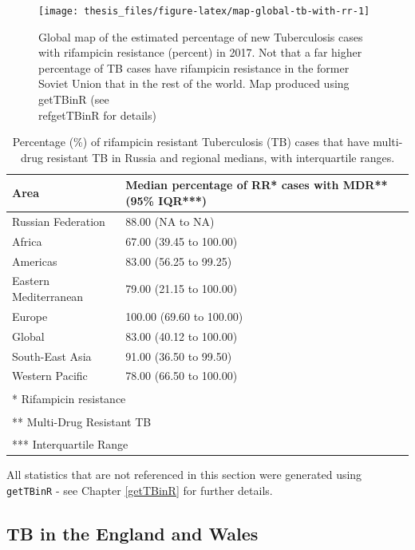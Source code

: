 \documentclass[11pt,twoside]{bristolthesis}
\begin{document}
  \begin{figure}
  
  {\centering \texttt{[image: thesis\_files/figure-latex/map-global-tb-with-rr-1]} 
  
  }
  
  \caption{Global map of the estimated percentage of new Tuberculosis cases with rifampicin resistance (percent) in 2017. Not that a far higher percentage of TB cases have rifampicin resistance in the former Soviet Union that in the rest of the world. Map produced using getTBinR (see \\ref{getTBinR} for details)}\label{fig:map-global-tb-with-rr}
  \end{figure}
  \begin{table}[!h]
  
  \caption{\label{tab:prop-rr-with-mdr-tab}Percentage (\%) of rifampicin resistant Tuberculosis (TB) cases that have multi-drug resistant TB in Russia and regional medians, with interquartile ranges.}
  \centering
  \begin{tabular}{ll}
  \toprule
  Area & Median percentage of RR* cases with MDR** (95\% IQR***)\\
  \midrule
  Russian Federation & 88.00 (NA to NA)\\
  Africa & 67.00 (39.45 to 100.00)\\
  Americas & 83.00 (56.25 to 99.25)\\
  Eastern Mediterranean & 79.00 (21.15 to 100.00)\\
  Europe & 100.00 (69.60 to 100.00)\\
  \addlinespace
  Global & 83.00 (40.12 to 100.00)\\
  South-East Asia & 91.00 (36.50 to 99.50)\\
  Western Pacific & 78.00 (66.50 to 100.00)\\
  \bottomrule
  \multicolumn{2}{l}{\textsuperscript{} * Rifampicin resistance}\\
  \multicolumn{2}{l}{\textsuperscript{} ** Multi-Drug Resistant TB}\\
  \multicolumn{2}{l}{\textsuperscript{} *** Interquartile Range}\\
  \end{tabular}
  \end{table}
  All statistics that are not referenced in this section were generated using \texttt{getTBinR} - see Chapter \ref{getTBinR} for further details.
  
  \hypertarget{tb-in-the-england-and-wales}{%
  \subsection{TB in the England and Wales}\label{tb-in-the-england-and-wales}}
  
\end{document}
